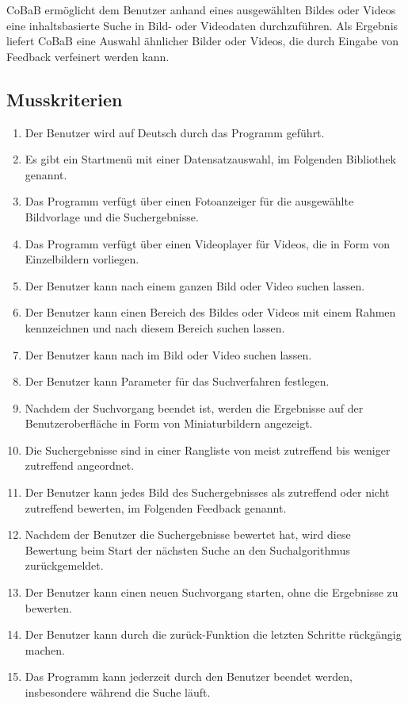 CoBaB ermöglicht dem Benutzer anhand eines ausgewählten Bildes oder Videos eine inhaltsbasierte Suche in Bild- oder Videodaten durchzuführen. Als Ergebnis liefert CoBaB eine Auswahl ähnlicher Bilder oder Videos, die durch Eingabe von \gls{Feedback} verfeinert werden kann.
\subsection{Musskriterien}
\begin{enumerate} [label=\bfseries /MK \arabic*0/, leftmargin=*]
\item Der Benutzer wird auf Deutsch durch das Programm geführt.
\item Es gibt ein Startmenü mit einer Datensatzauswahl, im Folgenden Bibliothek genannt.
\item Das Programm verfügt über einen Fotoanzeiger für die ausgewählte Bildvorlage und die Suchergebnisse.
\item Das Programm verfügt über einen Videoplayer für Videos, die in Form von Einzelbildern vorliegen.
\item Der Benutzer kann nach einem ganzen Bild oder Video suchen lassen.
\item Der Benutzer kann einen Bereich des Bildes oder Videos mit einem Rahmen kennzeichnen und nach diesem Bereich suchen lassen.
\item Der Benutzer kann nach  im Bild oder Video suchen lassen.
\item Der Benutzer kann Parameter für das Suchverfahren festlegen.
\item Nachdem der Suchvorgang beendet ist, werden die Ergebnisse auf der Benutzeroberfläche in Form von Miniaturbildern angezeigt.
\item Die Suchergebnisse sind in einer Rangliste von meist zutreffend bis weniger zutreffend angeordnet.
\item Der Benutzer kann jedes Bild des Suchergebnisses als zutreffend oder nicht zutreffend bewerten, im Folgenden \gls{Feedback} genannt.
\item Nachdem der Benutzer die Suchergebnisse bewertet hat, wird diese Bewertung beim Start der nächsten Suche an den Suchalgorithmus zurückgemeldet.
\item Der Benutzer kann einen neuen Suchvorgang starten, ohne die Ergebnisse zu bewerten.
\item Der Benutzer kann durch die zurück-Funktion die letzten Schritte rückgängig machen.
\item Das Programm kann jederzeit durch den Benutzer beendet werden, insbesondere während die Suche läuft.

\end{enumerate}
